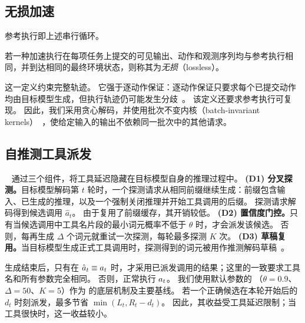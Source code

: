 \subsection{无损加速}
\label{sec:background:lossless}

参考执行即上述串行循环。

\begin{definition}[无损加速]
\label{def:lossless}
若一种加速执行在每项任务上提交的可见输出、动作和观测序列均与参考执行相同，并到达相同的最终环境状态，则称其为\emph{无损}（lossless）。
\end{definition}

这一定义约束完整轨迹。
它强于逐动作保证：逐动作保证只要求每个已提交动作均由目标模型生成，但执行轨迹仍可能发生分歧~\citep{xu2026leap}。
该定义还要求参考执行可复现。
因此，我们采用贪心解码，并使用批次不变内核（batch-invariant kernels）~\citep{he2025nondeterminism}，使给定输入的输出不依赖同一批次中的其他请求。

\subsection{自推测工具派发}
\label{sec:background:spork}

\spork~\citep{bai2026spork} 通过三个组件，将工具延迟隐藏在目标模型自身的推理过程中。
\textbf{(D1) 分叉探测。}目标模型解码第 $t$ 轮时，一个探测请求从相同前缀继续生成：前缀包含输入、已生成的推理，以及一个强制关闭推理并开始工具调用的后缀。
探测请求解码得到候选调用 $\hat a_t$。
由于复用了前缀缓存，其开销较低。
\textbf{(D2) 置信度门控。}只有当候选调用中工具名片段的最小词元概率不低于 $\theta$ 时，才会派发该候选。
否则，每再生成 $\Delta$ 个词元就重试一次探测，每轮最多探测 $K$ 次。
\textbf{(D3) 草稿复用。}当目标模型生成正式工具调用时，探测得到的词元被用作推测解码草稿~\citep{leviathan2023fast,chen2023accelerating}。

生成结束后，只有在 $\hat a_t\equiv a_{t}$ 时，才采用已派发调用的结果；这里的一致要求工具名和所有参数完全相同。
否则，正常执行 $a_{t}$。
我们使用默认参数的 \spork（$\theta=0.9$、$\Delta=50$、$K=5$）作为 \method 的底层机制及主要基线。
若一个正确候选在本轮开始后的 $d_t$ 时刻派发，\spork 最多节省 $\min(L_t,R_t-d_t)$。
因此，其收益受工具延迟限制；当工具很快时，这一收益较小。

